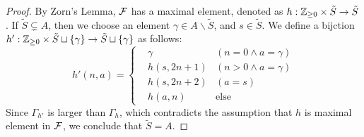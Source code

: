 \begin{proof}
  By Zorn's Lemma, ${\cal F}$ has a maximal element, denoted as $h: \mathbb Z_{\geq 0} \times \tilde{S} \to \tilde{S}$. If $\tilde{S} \subsetneq A$, then we choose an element $\gamma \in A \smallsetminus \tilde{S}$, and $s \in \tilde{S}$. We define a bijction $h': \mathbb Z_{\geq 0} \times \tilde{S} \sqcup \{ \gamma \} \to \tilde{S} \sqcup \{ \gamma \}$ as follows:
  \begin{equation*}
    h'(n, a) = \left\{
      \begin{aligned}
        & \gamma &(n=0 \land a = \gamma) \\
        & h(s, 2n+1) &(n>0 \land a = \gamma ) \\
        & h(s, 2n+2) &(a = s) \\
        & h(a, n) &\text{else}
      \end{aligned} 
    \right.
  \end{equation*}
  Since $\Gamma_{h'}$ is larger than $\Gamma_h$, which contradicts the assumption that $h$ is maximal element in ${\cal F}$, we conclude that $\tilde{S} = A$.
\end{proof}